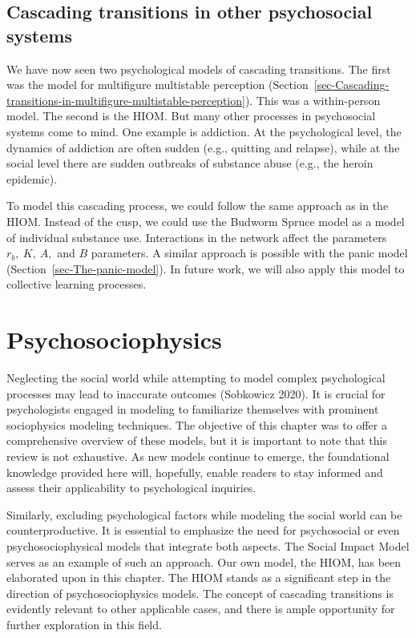 \documentclass[
  a4paper,
  DIV=11,
  numbers=noendperiod]{scrreprt}
\begin{document}
\hypertarget{sec-Cascading-transitions-in-other-psychosocial-systems}{%
\subsection{Cascading transitions in other psychosocial
systems}\label{sec-Cascading-transitions-in-other-psychosocial-systems}}

We have now seen two psychological models of cascading transitions. The
first was the model for multifigure multistable perception
(Section~\ref{sec-Cascading-transitions-in-multifigure-multistable-perception}).
This was a within-person model. The second is the HIOM. But many other
processes in psychosocial systems come to mind. One example is
addiction. At the psychological level, the dynamics of addiction are
often sudden (e.g., quitting and relapse), while at the social level
there are sudden outbreaks of substance abuse (e.g., the heroin
epidemic).

To model this cascading process, we could follow the same approach as in
the HIOM. Instead of the cusp, we could use the Budworm Spruce model as
a model of individual substance use. Interactions in the network affect
the parameters \(r_{b},\ K,\ A,\) and \(B\) parameters. A similar
approach is possible with the panic model
(Section~\ref{sec-The-panic-model}). In future work, we will also apply
this model to collective learning processes.

\hypertarget{sec-Psychosociophysics}{%
\section{Psychosociophysics}\label{sec-Psychosociophysics}}

Neglecting the social world while attempting to model complex
psychological processes may lead to inaccurate outcomes (Sobkowicz
2020). It is crucial for psychologists engaged in modeling to
familiarize themselves with prominent sociophysics modeling techniques.
The objective of this chapter was to offer a comprehensive overview of
these models, but it is important to note that this review is not
exhaustive. As new models continue to emerge, the foundational knowledge
provided here will, hopefully, enable readers to stay informed and
assess their applicability to psychological inquiries.

Similarly, excluding psychological factors while modeling the social
world can be counterproductive. It is essential to emphasize the need
for psychosocial or even psychosociophysical models that integrate both
aspects. The Social Impact Model serves as an example of such an
approach. Our own model, the HIOM, has been elaborated upon in this
chapter. The HIOM stands as a significant step in the direction of
psychosociophysics models. The concept of cascading transitions is
evidently relevant to other applicable cases, and there is ample
opportunity for further exploration in this field.
\end{document}

